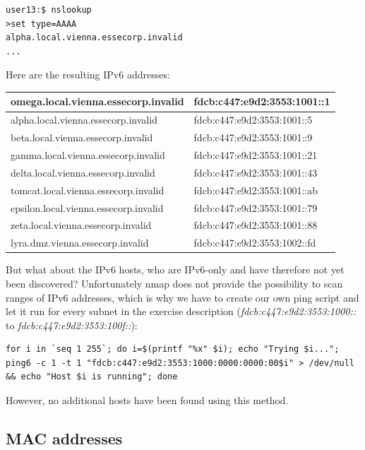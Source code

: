 \documentclass[12pt,a4paper,titlepage,oneside]{scrartcl}
\begin{document}
\begin{lstlisting}[style=simple]
user13:$ nslookup 
>set type=AAAA
alpha.local.vienna.essecorp.invalid
...
\end{lstlisting}

Here are the resulting IPv6 addresses:

\begin{tabular}{| l | l |}
\hline
omega.local.vienna.essecorp.invalid & fdcb:c447:e9d2:3553:1001::1 \\ \hline
alpha.local.vienna.essecorp.invalid & fdcb:c447:e9d2:3553:1001::5 \\ \hline
beta.local.vienna.essecorp.invalid & fdcb:c447:e9d2:3553:1001::9 \\ \hline
gamma.local.vienna.essecorp.invalid & fdcb:c447:e9d2:3553:1001::21 \\ \hline
delta.local.vienna.essecorp.invalid & fdcb:c447:e9d2:3553:1001::43 \\ \hline
tomcat.local.vienna.essecorp.invalid & fdcb:c447:e9d2:3553:1001::ab \\ \hline
epsilon.local.vienna.essecorp.invalid & fdcb:c447:e9d2:3553:1001::79 \\ \hline
zeta.local.vienna.essecorp.invalid & fdcb:c447:e9d2:3553:1001::88 \\ \hline
lyra.dmz.vienna.essecorp.invalid & fdcb:c447:e9d2:3553:1002::fd \\ \hline
\end{tabular}

But what about the IPv6 hosts, who are IPv6-only and have therefore not yet been discovered? Unfortunately nmap does not provide the possibility to scan ranges of IPv6 addresses, which is why we have to create our own ping script and let it run for every subnet in the exercise description (\emph{fdcb:c447:e9d2:3553:1000::} to \emph{fdcb:c447:e9d2:3553:100f::}):

\begin{lstlisting}[style=simple]
for i in `seq 1 255`; do i=$(printf "%x" $i); echo "Trying $i..."; ping6 -c 1 -t 1 "fdcb:c447:e9d2:3553:1000:0000:0000:00$i" > /dev/null && echo "Host $i is running"; done
\end{lstlisting}

However, no additional hosts have been found using this method.

\subsection{MAC addresses}
\end{document}
